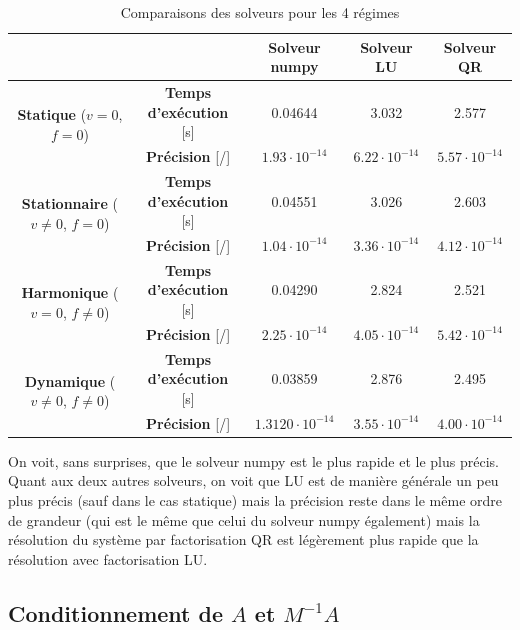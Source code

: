 \documentclass[11pt]{article}
\begin{document}
\begin{table} [h]
\centering
\begin{tabular}{|c|c||c|c|c|}
    \hline
     \multicolumn{2}{|c||}{}   & \textbf{Solveur numpy} & \textbf{Solveur LU} & \textbf{Solveur QR} \\
    \hline
    \multirow{2}{*}{\textbf{Statique} ($v=0$, $f=0$)} & \textbf{Temps d'exécution} [s] & 0.04644 & 3.032 & 2.577\\ \cline{2-5}
    & \textbf{Précision} [/] & $1.93 \cdot 10^{-14}$ & $6.22 \cdot 10^{-14}$  &  $5.57 \cdot 10^{-14}$\\
    \hline
    \multirow{2}{*}{\textbf{Stationnaire} ($v \neq 0$, $f=0$)} & \textbf{Temps d'exécution} [s] & 0.04551 & 3.026 & 2.603 \\ \cline{2-5}
    & \textbf{Précision} [/] & $1.04 \cdot 10^{-14}$ & $3.36\cdot 10^{-14}$& $4.12 \cdot 10^{-14}$\\
    \hline
    \multirow{2}{*}{\textbf{Harmonique} ($v=0$, $f\neq 0$)} & \textbf{Temps d'exécution} [s] & 0.04290 & 2.824 & 2.521\\ \cline{2-5}
    & \textbf{Précision} [/] & $2.25 \cdot 10^{-14}$ & $4.05\cdot 10^{-14}$ & $5.42 \cdot 10^{-14}$\\
    \hline
    \multirow{2}{*}{\textbf{Dynamique} ($v \neq 0$, $f \neq 0$)} & \textbf{Temps d'exécution} [s] & 0.03859 & 2.876 & 2.495\\ \cline{2-5}
    & \textbf{Précision} [/] & $1.3120 \cdot 10^{-14}$ & $3.55\cdot 10^{-14}$ & $4.00 \cdot 10^{-14}$\\
    \hline
\end{tabular}
\caption{Comparaisons des solveurs pour les 4 régimes}
\label{solvercomp}
\end{table}
On voit, sans surprises, que le solveur numpy est le plus rapide et le plus précis. Quant aux deux autres solveurs, on voit que LU est de manière générale un peu plus précis (sauf dans le cas statique) mais la précision reste dans le même ordre de grandeur (qui est le même que celui du solveur numpy également) mais la résolution du système par factorisation QR est légèrement plus rapide que la résolution avec factorisation LU. 
\vspace{-10pt}
\subsection{Conditionnement de $A$ et $M^{-1}A$}
\vspace{-8pt}
\end{document}
